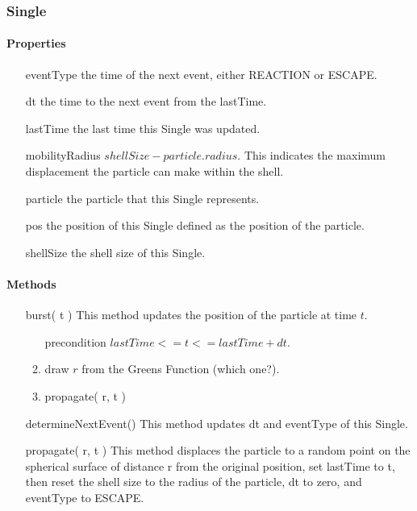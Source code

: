 \documentclass[english]{article}
\begin{document}
\subsubsection{Single}

\paragraph{Properties}

\begin{itemize}
\item[eventType] the time of the next event, either REACTION or ESCAPE.
\item[dt] the time to the next event from the lastTime.
\item[lastTime] the last time this Single was updated.
\item[mobilityRadius] $shellSize - particle.radius$.  This
  indicates the maximum displacement the particle can make within the
  shell.
\item[particle] the particle that this Single represents.
\item[pos] the position of this Single defined as the position of the
  particle.
\item[shellSize] the shell size of this Single.


\end{itemize}

\paragraph{Methods}

\begin{itemize}
\item[burst( t )] This method updates the position of the particle at
  time $t$.
  \begin{enumerate}
  \item[precondition] $lastTime <= t <= lastTime + dt$.

    \item draw $r$ from the Greens Function (which one?).

    \item propagate( r, t )
  \end{enumerate}

\item[determineNextEvent()] This method updates dt and eventType of
  this Single.


\item[propagate( r, t )] This method displaces the particle to a
  random point on the spherical surface of distance r from the
  original position, set lastTime to t, then reset the shell size to
  the radius of the particle, dt to zero, and eventType to ESCAPE.

\end{itemize}
\end{document}
